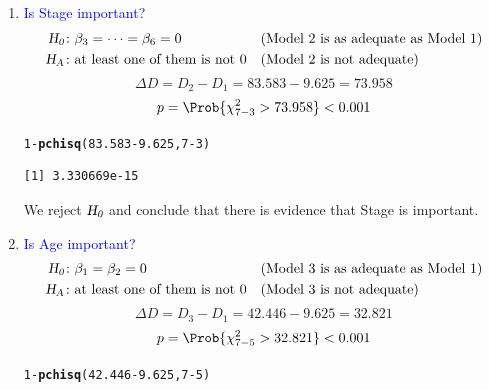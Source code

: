 \documentclass{article}\usepackage[]{graphicx}\usepackage[svgnames]{xcolor}
\makeatletter
\newcommand{\hlnum}[1]{\textcolor[rgb]{0.686,0.059,0.569}{#1}}%
\newcommand{\hlopt}[1]{\textcolor[rgb]{0,0,0}{#1}}%
\newcommand{\hlstd}[1]{\textcolor[rgb]{0.345,0.345,0.345}{#1}}%
\newcommand{\hlkwd}[1]{\textcolor[rgb]{0.737,0.353,0.396}{\textbf{#1}}}%
\newenvironment{kframe}{%
 \def\at@end@of@kframe{}%
 \ifinner\ifhmode%
  \def\at@end@of@kframe{\end{minipage}}%
  \begin{minipage}{\columnwidth}%
 \fi\fi%
 \def\FrameCommand##1{\hskip\@totalleftmargin \hskip-\fboxsep
 \colorbox{shadecolor}{##1}\hskip-\fboxsep
     \hskip-\linewidth \hskip-\@totalleftmargin \hskip\columnwidth}%
 \MakeFramed {\advance\hsize-\width
   \@totalleftmargin\z@ \linewidth\hsize
   \@setminipage}}%
 {\par\unskip\endMakeFramed%
 \at@end@of@kframe}
\newenvironment{knitrout}{}{} %
\newcommand{\HN}{\textsl{H}_{\textsl{0}}}%
\newcommand{\HA}{\textsl{H}_{\textsl{A}}}%
\makeatother
\begin{document}
\begin{enumerate}[1.]
    \item \textcolor{Blue}{Is Stage important?}
          \begin{align*}
              \HN & \colon \beta_3=\cdots=\beta_6=0             &  & \text{(Model 2 is as adequate as Model 1)} \\
              \HA & \colon \text{at least one of them is not 0} &  & \text{(Model 2 is not adequate)}
          \end{align*}
          \[ \Delta D=D_2-D_1=83.583-9.625=73.958 \]
          \[ p=\Prob{\chi^2_{7-3}>73.958}<0.001 \]
\begin{knitrout}
\color{fgcolor}\begin{kframe}
\begin{alltt}
\hlnum{1} \hlopt{-} \hlkwd{pchisq}\hlstd{(}\hlnum{83.583} \hlopt{-} \hlnum{9.625}\hlstd{,} \hlnum{7} \hlopt{-} \hlnum{3}\hlstd{)}
\end{alltt}
\begin{verbatim}
[1] 3.330669e-15
\end{verbatim}
\end{kframe}
\end{knitrout}
          We reject $ \HN $ and conclude that there is evidence that Stage is important.
    \item \textcolor{Blue}{Is Age important?}
          \begin{align*}
              \HN & \colon \beta_1=\beta_2=0                    &  & \text{(Model 3 is as adequate as Model 1)} \\
              \HA & \colon \text{at least one of them is not 0} &  & \text{(Model 3 is not adequate)}
          \end{align*}
          \[ \Delta D=D_3-D_1=42.446 - 9.625 = 32.821 \]
          \[ p=\Prob{\chi^2_{7-5}>32.821}<0.001 \]
\begin{knitrout}
\color{fgcolor}\begin{kframe}
\begin{alltt}
\hlnum{1} \hlopt{-} \hlkwd{pchisq}\hlstd{(}\hlnum{42.446} \hlopt{-} \hlnum{9.625}\hlstd{,} \hlnum{7} \hlopt{-} \hlnum{5}\hlstd{)}
\end{alltt}
\begin{verbatim}

\end{verbatim}
\end{kframe}
\end{knitrout}
\end{enumerate}
\end{document}
